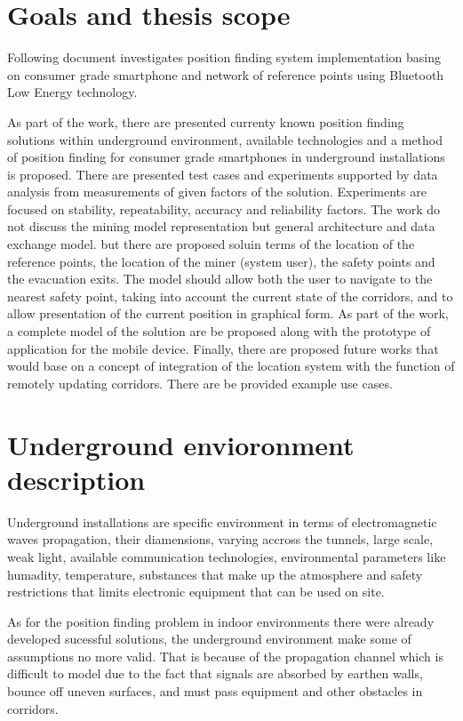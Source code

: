 \documentclass[../main.tex]{subfiles}
\begin{document}
\chapter{Goals and thesis scope}

Following document investigates position finding system implementation basing on consumer grade smartphone and network of reference points using Bluetooth Low Energy technology.

As part of the work, there are presented currenty known position finding solutions within underground environment, available technologies and a method of position finding for consumer grade smartphones in underground installations is proposed. There are presented test cases and experiments supported by data analysis from measurements of given factors of the solution. Experiments are focused on stability, repeatability, accuracy and reliability factors. The work do not discuss the mining model representation but general architecture and data exchange model. but there are proposed soluin terms of the location of the reference points, the location of the miner (system user), the safety points and the evacuation exits. The model should allow both the user to navigate to the nearest safety point, taking into account the current state of the corridors, and to allow presentation of the current position in graphical form. As part of the work, a complete model of the solution are be proposed along with the prototype of application for the mobile device. Finally, there are proposed future works that would base on a concept of integration of the location system with the function of remotely updating corridors. There are be provided example use cases.

\chapter{Underground envioronment description}

Underground installations are specific environment in terms of electromagnetic waves propagation, their diamensions, varying accross the tunnels, large scale, weak light, available communication technologies, environmental parameters like humadity, temperature, substances that make up the atmosphere and safety restrictions that limits electronic equipment that can be used on site.

As for the position finding problem in indoor environments there were already developed sucessful solutions, the underground environment make some of assumptions no more valid. That is because of the propagation channel which is difficult to model due to the fact that signals are absorbed by earthen walls, bounce off uneven surfaces, and must pass equipment and other obstacles in corridors.
\end{document}

